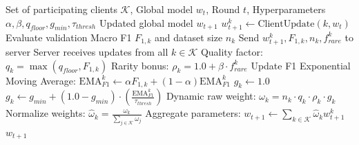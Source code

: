 \begin{algorithm}[htbp]
\caption{AdaptiveFedAvg Server Aggregation}
\label{alg:adaptivefedavg}
\small
\begin{algorithmic}[1]
\REQUIRE Set of participating clients $\mathcal{K}$, Global model $w_t$, Round $t$, Hyperparameters $\alpha, \beta, q_{floor}, g_{min}, \tau_{thresh}$
\ENSURE Updated global model $w_{t+1}$
    \STATE $w_{t+1}^k \leftarrow \text{ClientUpdate}(k, w_t)$
    \STATE Evaluate validation Macro F1 $F_{1,k}$ and dataset size $n_k$
    \STATE Send $w_{t+1}^k, F_{1,k}, n_k, f_{rare}^k$ to server
\ENDFOR
\STATE Server receives updates from all $k \in \mathcal{K}$
    \STATE Quality factor: $q_k = \max(q_{floor}, F_{1,k})$
    \STATE Rarity bonus: $\rho_k = 1.0 + \beta \cdot f_{rare}^k$
    \STATE Update F1 Exponential Moving Average:
    \STATE \quad $\text{EMA}_{F1}^k \leftarrow \alpha F_{1,k} + (1 - \alpha) \text{EMA}_{F1}^k$
        \STATE $g_k \leftarrow 1.0$
    \ELSE
        \STATE $g_k \leftarrow g_{min} + (1.0 - g_{min}) \cdot \left(\frac{\text{EMA}_{F1}^k}{\tau_{thresh}}\right)$
    \ENDIF
    \STATE Dynamic raw weight: $\omega_k = n_k \cdot q_k \cdot \rho_k \cdot g_k$
\ENDFOR
\STATE Normalize weights: $\hat{\omega}_k = \frac{\omega_k}{\sum_{j \in \mathcal{K}} \omega_j}$
\STATE Aggregate parameters: $w_{t+1} \leftarrow \sum_{k \in \mathcal{K}} \hat{\omega}_k w_{t+1}^k$
\RETURN $w_{t+1}$
\end{algorithmic}
\end{algorithm}
